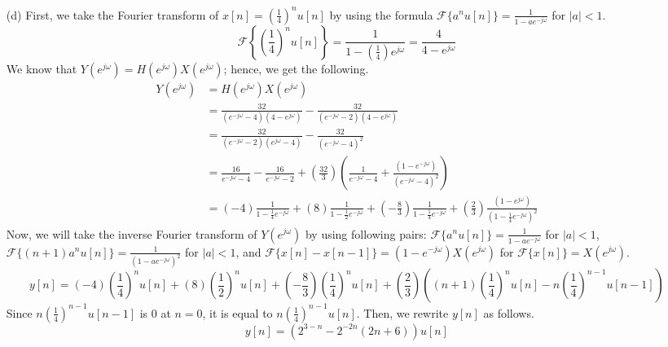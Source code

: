 \documentclass[10pt,a4paper, margin=1in]{article}
\begin{document}
\begin{enumerate}
\begin{itemize}
		\item[(d)]
			First, we take the Fourier transform of $x[n] = \left( \frac{1}{4} \right)^n u[n]$ by using the formula $\mathcal{F}\{a^nu[n]\} = \frac{1}{1-ae^{-j\omega}}$ for $|a| < 1$.
			\begin{equation}
				\mathcal{F}\left\{\left( \frac{1}{4} \right)^n u[n]\right\} = \frac{1}{1 - \left( \frac{1}{4} \right)e^{j\omega}} = \frac{4}{4 - e^{j\omega}}
			\end{equation}
			We know that $Y(e^{j\omega}) = H(e^{j\omega}) X(e^{j\omega})$; hence, we get the following.
			\begin{equation}
			\begin{split}
				Y(e^{j\omega}) & = H(e^{j\omega}) X(e^{j\omega})\\
				& = \frac{32}{(e^{-j\omega} - 4)(4 - e^{j\omega})} - \frac{32}{(e^{-j\omega} - 2)(4 - e^{j\omega})}\\
				& = \frac{32}{(e^{-j\omega} - 2)(e^{j\omega} - 4)} - \frac{32}{(e^{-j\omega} - 4)^2}\\
				& = \frac{16}{e^{-j\omega} - 4} - \frac{16}{e^{-j\omega} - 2} + \left( \frac{32}{3} \right) \left( \frac{1}{e^{-j\omega} - 4} + \frac{(1 - e^{-j\omega})}{(e^{-j\omega} - 4)^2} \right)\\
				& = (-4)\frac{1}{1 - \frac{1}{4}e^{-j\omega}} + (8)\frac{1}{1 - \frac{1}{2}e^{-j\omega}} + \left( -\frac{8}{3} \right)\frac{1}{1 - \frac{1}{4}e^{-j\omega}} + \left( \frac{2}{3} \right)\frac{(1 - e^{j\omega})}{(1 - \frac{1}{4}e^{-j\omega})^2}
			\end{split}
			\end{equation}
			Now, we will take the inverse Fourier transform of $Y(e^{j\omega})$ by using following pairs: $\mathcal{F}\{a^nu[n]\} = \frac{1}{1-ae^{-j\omega}}$ for $|a| < 1$, $\mathcal{F}\{(n + 1)a^nu[n]\} = \frac{1}{(1-ae^{-j\omega})^2}$ for $|a| < 1$, and $\mathcal{F}\{x[n] - x[n - 1]\} = (1 - e^{-j\omega})X(e^{j\omega})$ for $\mathcal{F}\{x[n]\} = X(e^{j\omega})$.
			\begin{equation}
				y[n] = (-4)\left( \frac{1}{4} \right)^nu[n] + (8)\left( \frac{1}{2} \right)^nu[n] + \left( -\frac{8}{3} \right)\left( \frac{1}{4} \right)^nu[n] + \left( \frac{2}{3} \right) \left( (n + 1)\left( \frac{1}{4} \right)^nu[n] - n\left( \frac{1}{4} \right)^{n-1}u[n - 1] \right)
			\end{equation}
			Since $n\left( \frac{1}{4} \right)^{n-1}u[n - 1]$ is $0$ at $n = 0$, it is equal to $n\left( \frac{1}{4} \right)^{n-1}u[n]$. Then, we rewrite $y[n]$ as follows.
			\begin{equation}
				y[n] = \left( 2^{3 - n} - 2^{-2n} \left( 2n + 6 \right) \right) u[n]
			\end{equation}


\end{itemize}
\end{enumerate}
\end{document}
